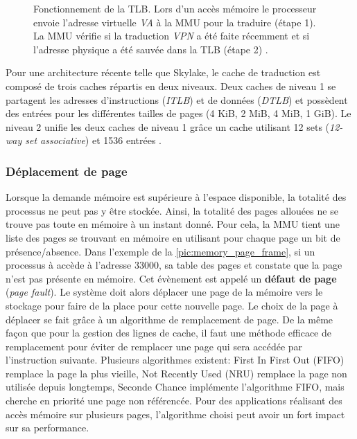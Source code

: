 \begin{figure}
\begin{subfigure}[t]{0.48\linewidth}
        \label{pic_memory_page_table_tlb_miss}
    \end{subfigure}
    \caption{Fonctionnement de la TLB. Lors d'un accès mémoire le processeur envoie l'adresse virtuelle \textit{VA} à la MMU pour la traduire (étape 1). La MMU vérifie si la traduction \textit{VPN} a été faite récemment et si l'adresse physique a été sauvée dans la TLB (étape 2) \cite{Mowry2012}.
    \label{pic_memory_page_table_tlb}}
\end{figure}



Pour une architecture récente telle que Skylake, le cache de traduction est composé de trois caches répartis en deux niveaux. Deux caches de niveau 1 se partagent les adresses d'instructions (\textit{ITLB}) et de données (\textit{DTLB}) et possèdent des entrées pour les différentes tailles de pages (4 KiB, 2 MiB, 4 MiB, 1 GiB). Le niveau 2 unifie les deux caches de niveau 1 grâce un cache utilisant 12 sets  (\textit{12-way set associative}) et 1536 entrées \cite{Wikichipb}.



\subsubsection{Déplacement de page} \label{sec:deplacement_page}

Lorsque la demande mémoire est supérieure à l'espace disponible, la totalité des processus ne peut pas y être stockée. Ainsi, la totalité des pages allouées ne se trouve pas toute en mémoire à un instant donné. Pour cela, la MMU tient une liste des pages se trouvant en mémoire en utilisant pour chaque page un bit de présence/absence. Dans l'exemple de la \autoref{pic:memory_page_frame}, si un processus à accède à l'adresse $33000$, sa table des pages et constate que la page n'est pas présente en mémoire. Cet évènement est appelé un \textbf{défaut de page} (\textit{page fault}). Le système doit alors déplacer une page de la mémoire vers le stockage pour faire de la place pour cette nouvelle page. Le choix de la page à déplacer se fait grâce à un algorithme de remplacement de page. De la même façon que pour la gestion des lignes de cache, il faut une méthode efficace de remplacement pour éviter de remplacer une page qui sera accédée par l'instruction suivante. Plusieurs algorithmes existent: First In First Out (FIFO) remplace la page la plus vieille, Not Recently Used (NRU) remplace la page non utilisée depuis longtemps, Seconde Chance implémente l'algorithme FIFO, mais cherche en priorité une page non référencée. Pour des applications réalisant des accès mémoire sur plusieurs pages, l'algorithme choisi peut avoir un fort impact sur sa performance.



